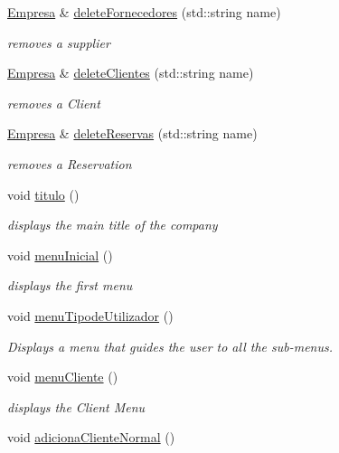 \begin{DoxyCompactItemize}
\hyperlink{classEmpresa}{Empresa} \& \hyperlink{classEmpresa_ab8b7dda77caceec58e464c16b7e45f7c}{delete\+Fornecedores} (std\+::string name)
\begin{DoxyCompactList}\small\item\em removes a supplier \end{DoxyCompactList}\item 
\hyperlink{classEmpresa}{Empresa} \& \hyperlink{classEmpresa_a52b9f4d94c2a05704d74854ed4dd1590}{delete\+Clientes} (std\+::string name)
\begin{DoxyCompactList}\small\item\em removes a Client \end{DoxyCompactList}\item 
\hyperlink{classEmpresa}{Empresa} \& \hyperlink{classEmpresa_a079c008b006f56faac3c1016fe770e8c}{delete\+Reservas} (std\+::string name)
\begin{DoxyCompactList}\small\item\em removes a Reservation \end{DoxyCompactList}\item 
void \hyperlink{classEmpresa_ad79f7196a8ce7256771cbd7b9542155c}{titulo} ()
\begin{DoxyCompactList}\small\item\em displays the main title of the company \end{DoxyCompactList}\item 
void \hyperlink{classEmpresa_ad77cdd5a6cbe2beb2078aa6bec2cfe28}{menu\+Inicial} ()
\begin{DoxyCompactList}\small\item\em displays the first menu \end{DoxyCompactList}\item 
void \hyperlink{classEmpresa_a544832c17fe7d592ae1d01bdc144059e}{menu\+Tipode\+Utilizador} ()
\begin{DoxyCompactList}\small\item\em Displays a menu that guides the user to all the sub-\/menus. \end{DoxyCompactList}\item 
void \hyperlink{classEmpresa_a2e8e13ecd162403da0118ceccdccbbcb}{menu\+Cliente} ()
\begin{DoxyCompactList}\small\item\em displays the Client Menu \end{DoxyCompactList}\item 
void \hyperlink{classEmpresa_a372599c8aee20690517cc3ae6c8e1ca7}{adiciona\+Cliente\+Normal} ()

\end{DoxyCompactItemize}
